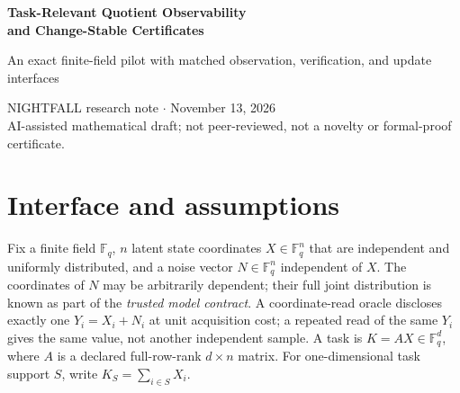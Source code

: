 \documentclass[11pt,letterpaper]{article}
\newcommand{\F}{\mathbb F}
\begin{document}
\begin{center}
{\Large\bfseries Task-Relevant Quotient Observability\\[3pt] and Change-Stable Certificates}\par\medskip
{\large An exact finite-field pilot with matched observation, verification, and update interfaces}\par\medskip
NIGHTFALL research note \(\cdot\) November 13, 2026\\
\small AI-assisted mathematical draft; not peer-reviewed, not a novelty or formal-proof certificate.
\end{center}

\begin{abstract}
We isolate a systems-engineering model in which the useful part of an observation is determined by a task quotient, not by the ambient dimension. For uniform finite-field state and arbitrary \emph{correlated} additive measurement noise, we give the exact conditional posterior and mutual information of a linear task after reading any subset of coordinates. Scalar modular tasks have pure information complementarity: every incomplete set of relevant coordinates gives zero improvement, and the complete set has a precisely calculable Bayes advantage. This yields an exact randomized expected-read--accuracy frontier, a sharp pre-observation versus task-revelation frontier for row--column networks, and an inductively checkable sparse-update rule. We explicitly price source reads, bounded-fan-in computation, raw-input checking, and authenticated-delta maintenance; all lower bounds apply only to those same interfaces. The underlying algebra is close to established finite-field coding, secret-sharing, and incremental-computation ideas. The contribution established here is an auditable synthesis and a candidate platform for a stronger theorem, \emph{not} a demonstrated new general result.
\end{abstract}

\section{Interface and assumptions}
Fix a finite field \(\F_q\), \(n\) latent state coordinates \(X\in\F_q^n\) that are independent and uniformly distributed, and a noise vector \(N\in\F_q^n\) independent of \(X\). The coordinates of \(N\) may be arbitrarily dependent; their full joint distribution is known as part of the \emph{trusted model contract}. A coordinate-read oracle discloses exactly one \(Y_i=X_i+N_i\) at unit acquisition cost; a repeated read of the same \(Y_i\) gives the same value, not another independent sample. A task is \(K=AX\in\F_q^d\), where \(A\) is a declared full-row-rank \(d\times n\) matrix. For one-dimensional task support \(S\), write \(K_S=\sum_{i\in S}X_i\).
\end{document}
